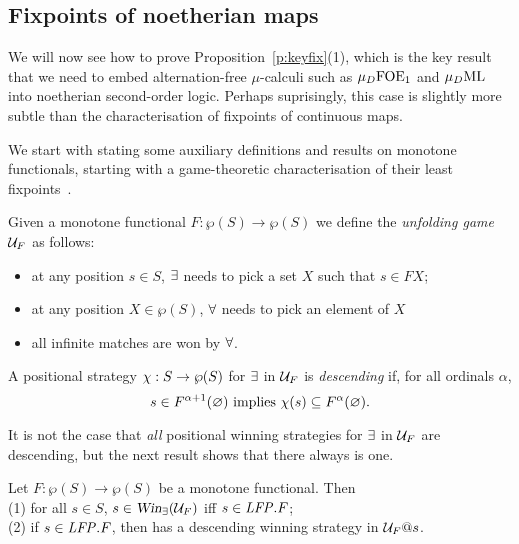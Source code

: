 \subsection{Fixpoints of noetherian maps}

We will now see how to prove Proposition~\ref{p:keyfix}(1), which is the key 
result that we need to embed alternation-free $\mu$-calculi such as 
$\mu_{D}\mathrm{FOE}_1$ and $\mu_{D}\mathrm{ML}$ into noetherian second-order logic.
Perhaps suprisingly, this case is slightly more subtle than the characterisation of
fixpoints of continuous maps.

%

We start with stating some auxiliary definitions and results on monotone 
functionals, starting with a game-theoretic characterisation of their least
fixpoints~\cite{Ven08}.

\begin{definition}
\label{d:unfgame}
Given a monotone functional $F: \wp(S)\to \wp(S)$ we define the 
\emph{unfolding game} $\mathcal{U}_{F}$ as follows:
\begin{itemize}
\item at any position $s \in S$, $\exists$ needs to pick a set $X$ such that 
$s \in FX$;
\item at any position $X \in \wp(S)$, $\forall$ needs to pick an element of 
$X$
\item all infinite matches are won by $\forall$.
\end{itemize}
A positional strategy $\chi: S \to \wp(S)$ for $\exists$ in $\mathcal{U}_{F}$ is 
\emph{descending} if, for all ordinals $\alpha$,
\begin{equation}
\label{eq:dec}
s \in F^{\alpha+1}(\nada) \text{ implies } \ystrat(s) \sse F^{\alpha}(\nada).
\end{equation}
\end{definition}

It is not the case that \emph{all} positional winning strategies for $\exists$ 
in $\mathcal{U}_{F}$ are descending, but the next result shows that there always is one.

\begin{proposition}
\label{p:unfg}
Let $F: \wp(S)\to \wp(S)$ be a monotone functional.
Then
\\(1) for all $s \in S$, $s \in \win_{\eloise}(\UG_{F})$ iff $s \in \mathit{LFP}. F$;
\\(2) if $s \in \mathit{LFP}. F$, then \eloise has a descending winning strategy in 
$\mathcal{U}_{F}@s$.
\end{proposition}

